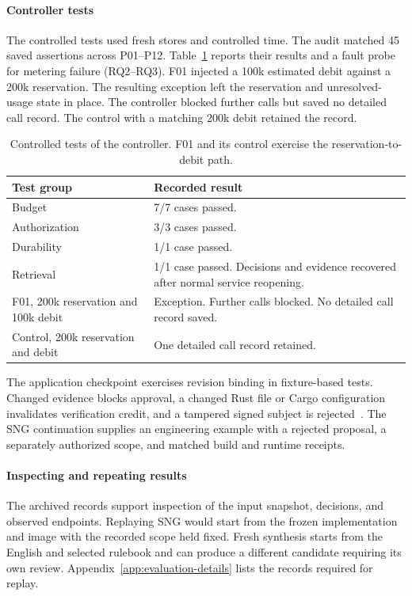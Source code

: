 \paragraph{Controller tests}
The controlled tests used fresh stores and controlled time. The audit matched 45 saved assertions across P01--P12. Table~\ref{tab:controller-results} reports their results and a fault probe for metering failure (RQ2--RQ3). F01 injected a 100k estimated debit against a 200k reservation. The resulting exception left the reservation and unresolved-usage state in place. The controller blocked further calls but saved no detailed call record. The control with a matching 200k debit retained the record.

\begin{table}[!htbp]
\caption{Controlled tests of the controller. F01 and its control exercise the reservation-to-debit path.}
\label{tab:controller-results}
\centering\small
\begin{tabular}{@{}p{}p{}@{}}
\toprule
Test group & Recorded result \\
\midrule
Budget & 7/7 cases passed. \\
Authorization & 3/3 cases passed. \\
Durability & 1/1 case passed. \\
Retrieval & 1/1 case passed. Decisions and evidence recovered after normal service reopening. \\
F01, 200k reservation and 100k debit & Exception. Further calls blocked. No detailed call record saved. \\
Control, 200k reservation and debit & One detailed call record retained. \\
\bottomrule
\end{tabular}
\end{table}

The application checkpoint exercises revision binding in fixture-based tests. Changed evidence blocks approval, a changed Rust file or Cargo configuration invalidates verification credit, and a tampered signed subject is rejected~\cite{scpCheckpoint,checkpointBuild}. The SNG continuation supplies an engineering example with a rejected proposal, a separately authorized scope, and matched build and runtime receipts.

\paragraph{Inspecting and repeating results}
The archived records support inspection of the input snapshot, decisions, and observed endpoints. Replaying SNG would start from the frozen implementation and image with the recorded scope held fixed. Fresh synthesis starts from the English and selected rulebook and can produce a different candidate requiring its own review. Appendix~\ref{app:evaluation-details} lists the records required for replay.
